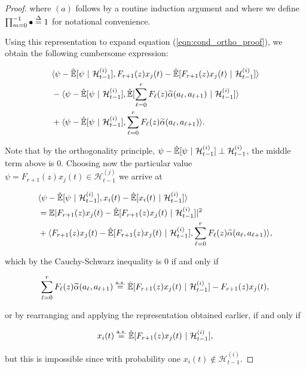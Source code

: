 \documentclass[12pt]{article}
\def\H{\mathcal{H}}  %
\newcommand{\linE}[2]{\hat{\E}[#1\ |\ #2]}  %
\newcommand{\wtalpha}[2]{\widetilde{\alpha}(#1, #2)}  %
\begin{document}
\begin{proof}
  where $(a)$ follows by a routine induction argument and where we define $\prod_{m = 0}^{-1} \bullet \overset{\Delta}{=} 1$ for notational convenience.

  Using this representation to expand equation (\ref{eqn:cond_ortho_proof}), we obtain the following cumbersome expression:

  \begin{align*}
    &\inner{\psi - \linE{\psi}{\H_{t - 1}^{(i)}}}{F_{r + 1}(z)x_j(t) - \linE{F_{r + 1}(z)x_j(t)}{\H_{t - 1}^{(i)}}}\\
    &- \inner{\psi - \linE{\psi}{\H_{t - 1}^{(i)}}}{\linE{\sum_{\ell = 0}^r F_\ell(z)\wtalpha{a_\ell}{a_{\ell + 1}}}{\H_{t - 1}^{(i)}}}\\
    &+ \inner{\psi - \linE{\psi}{\H_{t - 1}^{(i)}}}{\sum_{\ell = 0}^r F_\ell(z)\wtalpha{a_\ell}{a_{\ell + 1}}}.
  \end{align*}

  Note that by the orthogonality principle, $\psi - \linE{\psi}{\H_{t - 1}^{(i)}} \perp \H_{t - 1}^{(i)}$, the middle term above is $0$.  Choosing now the particular value $\psi = F_{r + 1}(z)x_j(t) \in \H_{t - 1}^{(j)}$ we arrive at

  \begin{align*}
    &\inner{\psi - \linE{\psi}{\H_{t - 1}^{(i)}}}{x_i(t) - \linE{x_i(t)}{\H_{t - 1}^{(i)}}}\\
    &= \E|F_{r + 1}(z)x_j(t) - \linE{F_{r + 1}(z)x_j(t)}{\H_{t - 1}^{(i)}}|^2\\
    &+ \inner{F_{r + 1}(z)x_j(t) - \linE{F_{r + 1}(z)x_j(t)}{\H_{t - 1}^{(i)}}}{\sum_{\ell = 0}^r F_\ell(z) \wtalpha{a_\ell}{a_{\ell + 1}}},
  \end{align*}

  which by the Cauchy-Schwarz inequality is $0$ if and only if

  \begin{equation*}
    \sum_{\ell = 0}^r F_\ell(z) \wtalpha{a_\ell}{a_{\ell + 1}} \overset{\text{a.s.}}{=} \linE{F_{r + 1}(z)x_j(t)}{\H_{t - 1}^{(i)}} - F_{r + 1}(z)x_j(t),
  \end{equation*}

  or by rearranging and applying the representation obtained earlier, if and only if

  \begin{equation*}
    x_i(t) \overset{\text{a.s.}}{=} \linE{F_{r + 1}(z)x_j(t)}{\H_{t - 1}^{(i)}},
  \end{equation*}

  but this is impossible since with probability one $x_i(t) \not \in \H_{t - 1}^{(i)}$.
\end{proof}
\end{document}
